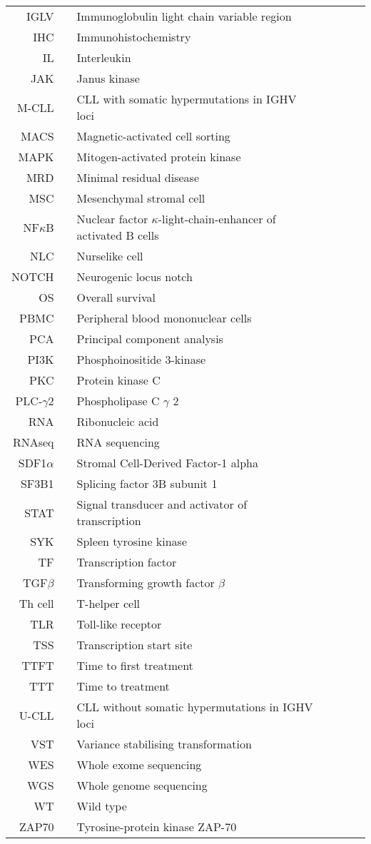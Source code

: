 \documentclass[11pt, a4paper, twosided]{book}
\begin{document}
\newpage   
\begin{tabular}{rp{0.2cm}lp{1cm}rp{0.2cm}l}
  IGLV & & Immunoglobulin light chain variable region \\
    IHC & & Immunohistochemistry \\
    IL & & Interleukin \\
    JAK & & Janus kinase \\
    M-CLL & & CLL with somatic hypermutations in IGHV loci \\
    MACS & & Magnetic-activated cell sorting \\
    MAPK & & Mitogen-activated protein kinase  \\
    MRD & & Minimal residual disease  \\
    MSC & & Mesenchymal stromal cell  \\
    NF$\kappa$B & & Nuclear factor $\kappa$-light-chain-enhancer of activated B cells \\
    NLC & & Nurselike cell  \\
    NOTCH & & Neurogenic locus notch  \\
    OS & & Overall survival \\
    PBMC & & Peripheral blood mononuclear cells \\
    PCA & & Principal component analysis \\
    PI3K & & Phosphoinositide 3-kinase \\
    PKC & & Protein kinase C \\
    PLC-$\gamma$2 & & Phospholipase C $\gamma$ 2 \\
    RNA & & Ribonucleic acid  \\
    RNAseq & & RNA sequencing \\
    SDF1$\alpha$ & & Stromal Cell-Derived Factor-1 alpha  \\
    SF3B1 & & Splicing factor 3B subunit 1 \\
    STAT & & Signal transducer and activator of transcription \\
    SYK & & Spleen tyrosine kinase \\
    TF & & Transcription factor \\
    TGF$\beta$ & & Transforming growth factor $\beta$ \\
    Th cell & & T-helper cell \\
    TLR & & Toll-like receptor \\ 
    TSS & & Transcription start site \\
    TTFT & & Time to first treatment \\
    TTT & & Time to treatment \\
    U-CLL & & CLL without somatic hypermutations in IGHV loci \\
    VST & & Variance stabilising transformation \\
    WES & & Whole exome sequencing \\
    WGS & & Whole genome sequencing \\
    WT & & Wild type \\
    ZAP70 & & Tyrosine-protein kinase ZAP-70 \\
    
\end{tabular}
\end{document}
